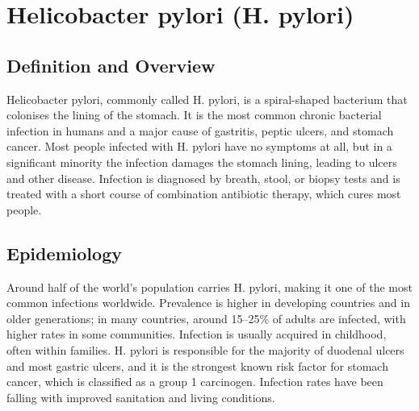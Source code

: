 \chapter{Helicobacter pylori (H. pylori)}

\section*{Definition and Overview}
Helicobacter pylori, commonly called H. pylori, is a spiral-shaped bacterium that colonises the lining of the stomach. It is the most common chronic bacterial infection in humans and a major cause of gastritis, peptic ulcers, and stomach cancer. Most people infected with H. pylori have no symptoms at all, but in a significant minority the infection damages the stomach lining, leading to ulcers and other disease. Infection is diagnosed by breath, stool, or biopsy tests and is treated with a short course of combination antibiotic therapy, which cures most people.

\section*{Epidemiology}
Around half of the world's population carries H. pylori, making it one of the most common infections worldwide. Prevalence is higher in developing countries and in older generations; in many countries, around 15--25\% of adults are infected, with higher rates in some communities. Infection is usually acquired in childhood, often within families. H. pylori is responsible for the majority of duodenal ulcers and most gastric ulcers, and it is the strongest known risk factor for stomach cancer, which is classified as a group 1 carcinogen. Infection rates have been falling with improved sanitation and living conditions.

